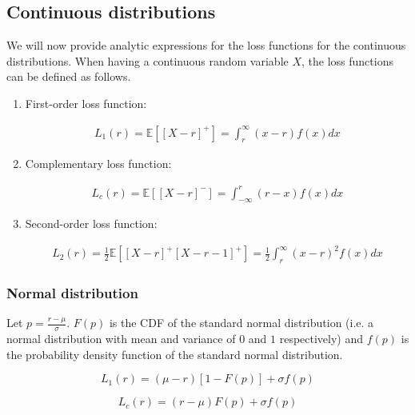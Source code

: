 \documentclass{article}
\begin{document}
\subsection{Continuous distributions}
We will now provide analytic expressions for the loss functions for the continuous distributions.
When having a continuous random variable $X$, the loss functions can be defined as follows.

\begin{enumerate}

    \item First-order loss function:

          \begin{align*}
              L_1(r) = \mathbb{E}[[X-r]^+] = \int_r^\infty (x-r)f(x)dx
          \end{align*}

    \item Complementary loss function:

          \begin{align*}
              L_c(r) = \mathbb{E}[[X-r]^-] = \int_{-\infty}^r (r-x)f(x)dx
          \end{align*}

    \item Second-order loss function:

          \begin{align*}
              L_2(r) = \frac{1}{2}\mathbb{E}[[X-r]^+[X-r-1]^+] = \frac{1}{2}\int_r^\infty (x-r)^2f(x)dx
          \end{align*}

\end{enumerate}

\subsubsection{Normal distribution}

Let $p = \frac{r-\mu}{\sigma}$. $F(p)$ is the CDF of the standard normal distribution (i.e. a normal distribution with mean and variance of $0$ and $1$ respectively) and $f(p)$ is the probability density function of the standard normal distribution.

\begin{equation}
    L_1(r) = (\mu-r)[1-F(p)]+\sigma f(p)
\end{equation}

\begin{equation}
    L_c(r) = (r-\mu)F(p)+\sigma f(p)
\end{equation}
\end{document}

